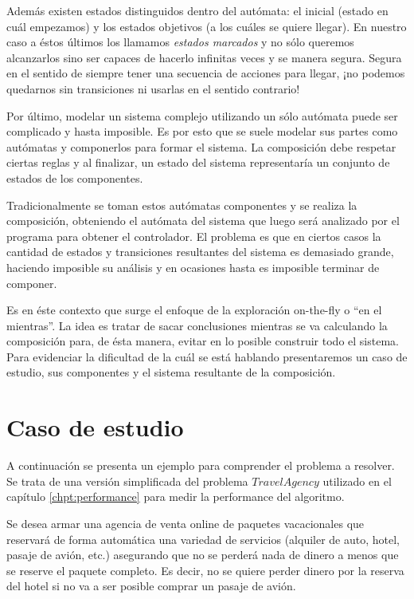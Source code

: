 Además existen estados distinguidos dentro del autómata: el inicial (estado en cuál empezamos) y los estados objetivos (a los cuáles se quiere llegar). En nuestro caso a éstos últimos los llamamos \textit{estados marcados} y no sólo queremos alcanzarlos sino ser capaces de hacerlo infinitas veces y se manera segura. Segura en el sentido de siempre tener una secuencia de acciones para llegar, ¡no podemos quedarnos sin transiciones ni usarlas en el sentido contrario!

Por último, modelar un sistema complejo utilizando un sólo autómata puede ser complicado y hasta imposible. Es por esto que se suele modelar sus partes como autómatas y componerlos para formar el sistema. La composición debe respetar ciertas reglas y al finalizar, un estado del sistema representaría un conjunto de estados de los componentes. %

Tradicionalmente se toman estos autómatas componentes y se realiza la composición, obteniendo el autómata del sistema que luego será analizado por el programa para obtener el controlador. El problema es que en ciertos casos la cantidad de estados y transiciones resultantes del sistema es demasiado grande, haciendo imposible su análisis y en ocasiones hasta es imposible terminar de componer.

Es en éste contexto que surge el enfoque de la exploración on-the-fly o ``en el mientras''. La idea es tratar de sacar conclusiones mientras se va calculando la composición para, de ésta manera, evitar en lo posible construir todo el sistema. Para evidenciar la dificultad de la cuál se está hablando presentaremos un caso de estudio, sus componentes y el sistema resultante de la composición.


\section{Caso de estudio}\label{chpt:casoAviones}
A continuación se presenta un ejemplo para comprender el problema a resolver. Se trata de una versión simplificada del problema $Travel Agency$ utilizado en el capítulo \ref{chpt:performance} para medir la performance del algoritmo.

Se desea armar una agencia de venta online de paquetes vacacionales que reservará de forma automática una variedad de servicios (alquiler de auto, hotel, pasaje de avión, etc.) asegurando que no se perderá nada de dinero a menos que se reserve el paquete completo. Es decir, no se quiere perder dinero por la reserva del hotel si no va a ser posible comprar un pasaje de avión.

